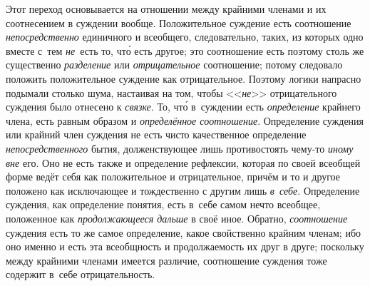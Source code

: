 Этот переход основывается на отношении между крайними членами и их соотнесением
в суждении вообще. Положительное суждение есть соотношение
{\em непосредственно} единичного и всеобщего, следовательно, таких, из которых
одно вместе с~тем {\em не}~есть то, чт\'{о} есть другое; это соотношение есть
поэтому столь же существенно {\em разделение} или {\em отрицательное}
соотношение; потому следовало положить положительное суждение как отрицательное.
Поэтому логики напрасно подымали столько шума, настаивая на том, чтобы
<<{\em не}>> отрицательного суждения было отнесено к {\em связке}. То, чт\'{о}
в~суждении есть {\em определение} крайнего члена, есть равным образом
и {\em определённое соотношение}. Определение суждения или крайний член
суждения не есть чисто качественное определение {\em непосредственного} бытия,
долженствующее лишь противостоять чему-то {\em иному вне} его. Оно не есть
также и определение рефлексии, которая по своей всеобщей форме ведёт себя как
положительное и отрицательное, причём и то и другое положено как исключающее и
тождественно с другим лишь {\em в~себе}. Определение суждения, как определение
понятия, есть в~себе самом нечто всеобщее, положенное как {\em продолжающееся
дальше} в своё иное. Обратно, {\em соотношение} суждения есть то же самое
определение, какое свойственно крайним членам; ибо оно именно и есть эта
всеобщность и продолжаемость их друг в друге; поскольку между крайними членами
имеется различие, соотношение суждения тоже содержит в~себе отрицательность.

